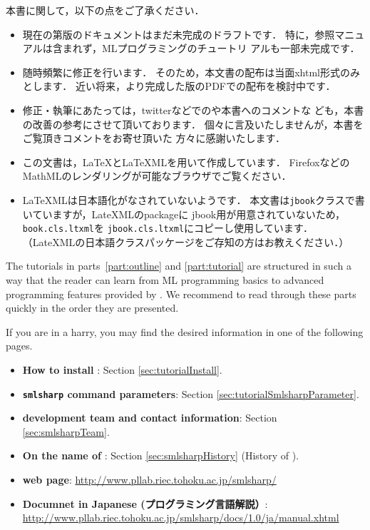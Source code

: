 本書に関して，以下の点をご了承ください．
\begin{itemize}
\item 
	現在の第\version{}版のドキュメントはまだ未完成のドラフトです．
	特に，参照マニュアルは含まれず，MLプログラミングのチュートリ
アルも一部未完成です．

\item 随時頻繁に修正を行います．
	そのため，本文書の配布は当面xhtml形式のみとします．
	近い将来，より完成した版のPDFでの配布を検討中です．
\item
	修正・執筆にあたっては，twitterなどでの\smlsharp{}や本書へのコメントな
ども，本書の改善の参考にさせて頂いております．
	個々に言及いたしませんが，本書をご覧頂きコメントをお寄せ頂いた
方々に感謝いたします． 

\item この文書は，LaTeXとLaTeXMLを用いて作成しています．
FirefoxなどのMathMLのレンダリングが可能なブラウザでご覧ください．

\item LaTeXMLは日本語化がなされていないようです．
	本文書は{\tt jbook}クラスで書いていますが，LateXMLのpackageに
jbook用が用意されていないため，{\tt book.cls.ltxml}を
{\tt jbook.cls.ltxml}にコピーし使用しています．
	（LateXMLの日本語クラスパッケージをご存知の方はお教えください．）
\end{itemize}
\else%

	The tutorials in parts~\ref{part:outline} and
\ref{part:tutorial} are structured in such a way that the reader can
learn from ML programming basics to advanced programming features
provided by \smlsharp{}.
	We recommend to read through these parts quickly in the order
they are presented.

	If you are in a harry, you may find the desired information in
one of the following pages.
\begin{itemize}
\item {\bf How to install \smlsharp{}}: Section \ref{sec:tutorialInstall}.
\item {\bf {\tt smlsharp} command parameters}: Section \ref{sec:tutorialSmlsharpParameter}.
\item {\bf \smlsharp{} development team and contact information}: 
Section \ref{sec:smlsharpTeam}.
\item {\bf On the name of \smlsharp{}}: Section \ref{sec:smlsharpHistory} (History of \smlsharp).
\item {\bf \smlsharp{} web page}: 
\url{http://www.pllab.riec.tohoku.ac.jp/smlsharp/}
\item {\bf \smlsharp{} Documnet in Japanese (プログラミング言語\smlsharp{}解説）}:
\url{http://www.pllab.riec.tohoku.ac.jp/smlsharp/docs/1.0/ja/manual.xhtml}
\end{itemize}

